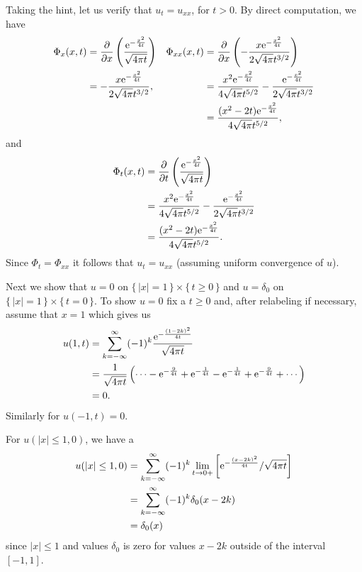 \begin{solution*}
  Taking the hint, let us verify that \(u_t=u_{xx}\), for \(t>0\). By
  direct computation, we have
  \begin{align*}
    \Phi_x(x,t)
    &=\frac{\partial}{\partial x}
      \left(\frac{\mathrm{e}^{-\frac{x^2}{4t}}}{\sqrt{4\pi t}}\right)
    &\Phi_{xx}(x,t)
    &=\frac{\partial}{\partial x}
      \left(-\frac{x\mathrm{e}^{-\frac{x^2}{4t}}}{2\sqrt{4\pi}t^{3/2}}\right)\\
    &=-\frac{x\mathrm{e}^{-\frac{x^2}{4t}}}{2\sqrt{4\pi}t^{3/2}},
    &&=\frac{x^2\mathrm{e}^{-\frac{x^2}{4t}}}{4\sqrt{4\pi}t^{5/2}}
      -\frac{\mathrm{e}^{-\frac{x^2}{4t}}}{2\sqrt{4\pi}t^{3/2}}
    \\
    &&&=\frac{(x^2-2t)\mathrm{e}^{-\frac{x^2}{4t}}}{4\sqrt{4\pi}t^{5/2}},
  \end{align*}
  and
  \begin{align*}
    \Phi_t(x,t)
    &=\frac{\partial}{\partial t}
      \left(\frac{\mathrm{e}^{-\frac{x^2}{4t}}}{\sqrt{4\pi t}}\right)\\
    &=\frac{x^2\mathrm{e}^{-\frac{x^2}{4t}}}{4\sqrt{4\pi}t^{5/2}}
      -\frac{\mathrm{e}^{-\frac{x^2}{4t}}}{2\sqrt{4\pi}t^{3/2}}\\
    &=\frac{(x^2-2t)\mathrm{e}^{-\frac{x^2}{4t}}}{4\sqrt{4\pi}t^{5/2}}.
  \end{align*}
  Since \(\Phi_t=\Phi_{xx}\) it follows that \(u_t=u_{xx}\) (assuming
  uniform convergence of \(u\)).

  Next we show that \(u=0\) on \(\{\,|x|=1\,\}\times\{\,t\geq 0\,\}\) and
  \(u=\delta_0\) on \(\{\,|x|=1\,\}\times\{\,t=0\,\}\). To show \(u=0\) fix
  a \(t\geq 0\) and, after relabeling if necessary, assume that \(x=1\)
  which gives us
  \begin{align*}
    u(1,t)
    &=\sum_{k=-\infty}^\infty(-1)^k\frac{\rme^{-\frac{(1-2k)^2}{4t}}}{\sqrt{4\pi
      t}}\\
    &=\frac{1}{\sqrt{4\pi t}}%
      \left(\dotsb-\rme^{-\frac{9}{4t}}%
      +\rme^{-\frac{1}{4t}}-\rme^{-\frac{1}{4t}}%
      +\rme^{-\frac{9}{4t}}+\dotsb\right)\\
    &=0.
  \end{align*}
  Similarly for \(u(-1,t)=0\).

  For \(u(|x|\leq 1,0)\), we have a
  \begin{align*}
    u(|x|\leq 1,0)
    &=\sum_{k=-\infty}^\infty(-1)^k\lim_{t\to 0+}
      \left[\mathrm{e}^{-\frac{(x-2k)^2}{4t}}/\sqrt{4\pi t}\right]\\
    &=\sum_{k=-\infty}^\infty(-1)^k\delta_0(x-2k)\\
    &=\delta_0(x)
  \end{align*}
  since \(|x|\leq 1\) and values \(\delta_0\) is zero for values \(x-2k\)
  outside of the interval \([-1,1]\).


\end{solution*}
